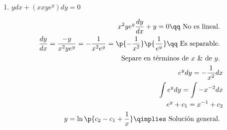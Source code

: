 \begin{enumerate}
    \item $\displaystyle ydx+(xxye^y)dy=0$ 
        \begin{center}
           \begin{align*}
               x^2ye^y\frac{d y}{d x} +y = 0 \qq \text{ No es lineal. } \\ 
               \frac{d y}{d x} = \frac{-y}{x^2ye^y} = -\frac{1}{x^2e^y} = \p{-\frac{1}{x^2}} \p{\frac{1}{e^y}} \qq \text{ Es separable. } \\ 
               \text{ Separe en términos de $x$ \& de $y$. } \\ 
               e^ydy=-\frac{1}{x^2}dx \\ 
               \int e^ydy=\int -x^{-2}dx \\ 
               e^y + c_1 = x^{-1} + c_2 \\ 
               y = \ln\p{ c_2 - c_1 + \frac{1}{x} } \qimplies \text{ Solución general. } \\ 
           \end{align*}
        \end{center}
\end{enumerate}
